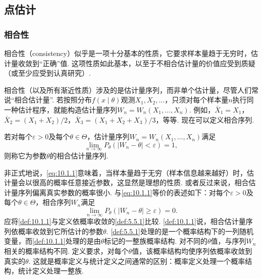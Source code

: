 \subsection{点估计}\label{sec:10.1}
\subsubsection{相合性}\label{sec:10.1.1}

相合性（consistency）似乎是一项十分基本的性质，它要求样本量趋于无穷时，估计量收敛到“正确”值. 这项性质如此基本，以至于不相合估计量的价值应受到质疑（或至少应受到认真研究）.

相合性（以及所有渐近性质）涉及的是估计量序列，而非单个估计量，尽管人们常说“相合估计量”. 若按照分布$f(x\mid\theta)$观测$X_1,X_2,\ldots$，只须对每个样本量$n$执行同一种估计程序，就能构造估计量序列$W_n=W_n(X_1,\ldots,X_n)$. 例如，$\bar X_1=X_1$，$\bar X_2=(X_1+X_2)/2$，$\bar X_3=(X_1+X_2+X_3)/3$，等等. 现在可以定义相合序列.

\begin{definition}\label{def:10.1.1}
若对每个$\varepsilon>0$及每个$\theta\in\Theta$，估计量序列$W_n=W_n(X_1,\ldots,X_n)$满足
\begin{equation}\label{eq:10.1.1}
\lim_{n\to\infty}P_\theta(|W_n-\theta|<\varepsilon)=1,
\end{equation}
则称它为参数$\theta$的相合估计量序列.
\end{definition}

非正式地说，\eqref{eq:10.1.1}意味着，当样本量趋于无穷（样本信息越来越好）时，估计量会以很高的概率任意接近参数，这显然是理想的性质. 或者反过来说，相合估计量序列偏离真实参数的概率很小.
与\eqref{eq:10.1.1}等价的表述如下：对每个$\varepsilon>0$及每个$\theta\in\Theta$，相合序列$W_n$满足
\begin{equation}\label{eq:10.1.2}
\lim_{n\to\infty}P_\theta(|W_n-\theta|\geq\varepsilon)=0.
\end{equation}
应将\autoref{def:10.1.1}与定义依概率收敛的\autoref{def:5.5.1}比较. \autoref{def:10.1.1}说，相合估计量序列依概率收敛到它所估计的参数$\theta$. \autoref{def:5.5.1}处理的是一个概率结构下的一列随机变量，而\autoref{def:10.1.1}处理的是由$\theta$标记的一整族概率结构. 对不同的$\theta$值，与序列$W_n$相关的概率结构不同. 定义要求，对每个$\theta$值，该概率结构均使序列依概率收敛到真实的$\theta$. 这就是概率定义与统计定义之间通常的区别：概率定义处理一个概率结构，统计定义处理一整族.

